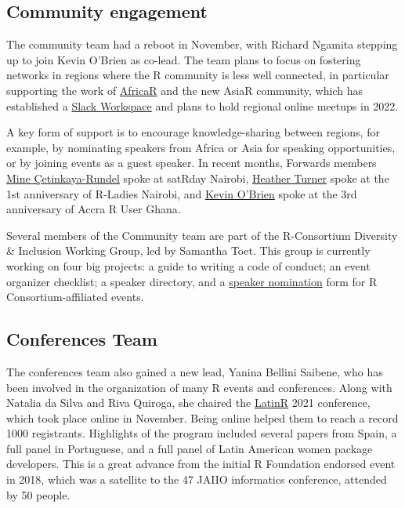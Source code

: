 \hypertarget{community-engagement}{%
\subsection{Community engagement}\label{community-engagement}}

The community team had a reboot in November, with Richard Ngamita
stepping up to join Kevin O'Brien as co-lead. The team plans to focus on
fostering networks in regions where the R community is less well
connected, in particular supporting the work of
\href{https://africa-r.org/}{AfricaR} and the new AsiaR community, which
has established a \href{https://bit.ly/join_asiaR_slack}{Slack
Workspace} and plans to hold regional online meetups in 2022.

A key form of support is to encourage knowledge-sharing between regions,
for example, by nominating speakers from Africa or Asia for speaking
opportunities, or by joining events as a guest speaker. In recent
months, Forwards members
\href{https://twitter.com/minebocek/status/1434173671313190913}{Mine
Çetinkaya-Rundel} spoke at satRday Nairobi,
\href{https://twitter.com/HeathrTurnr/status/1459495802850746370}{Heather
Turner} spoke at the 1st anniversary of R-Ladies Nairobi, and
\href{https://twitter.com/RUsersGhana/status/1482079597214773248}{Kevin
O'Brien} spoke at the 3rd anniversary of Accra R User Ghana.

Several members of the Community team are part of the R-Consortium
Diversity \& Inclusion Working Group, led by Samantha Toet. This group
is currently working on four big projects: a guide to writing a code of
conduct; an event organizer checklist; a speaker directory, and a
\href{https://www.r-consortium.org/blog/2021/07/14/r-consortium-diversity-inclusion-speaker-nomination}{speaker
nomination} form for R Consortium-affiliated events.

\hypertarget{conferences-team}{%
\subsection{Conferences Team}\label{conferences-team}}

The conferences team also gained a new lead, Yanina Bellini Saibene, who
has been involved in the organization of many R events and conferences.
Along with Natalia da Silva and Riva Quiroga, she chaired the
\href{https://latin-r.com/en}{LatinR} 2021 conference, which took place
online in November. Being online helped them to reach a record 1000
registrants. Highlights of the program included several papers from
Spain, a full panel in Portuguese, and a full panel of Latin American
women package developers. This is a great advance from the initial R
Foundation endorsed event in 2018, which was a satellite to the 47 JAIIO
informatics conference, attended by 50 people.

